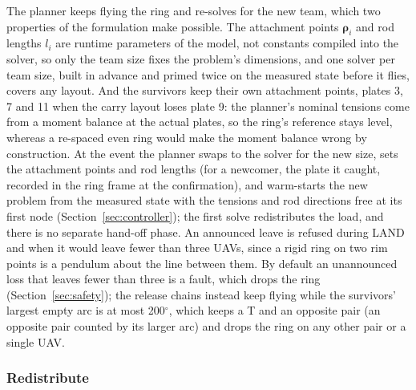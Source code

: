 The planner keeps flying the ring and re-solves for the new team, which two properties of the formulation make
possible. The attachment points $\boldsymbol{\rho}_i$ and rod lengths $l_i$ are runtime parameters of the model, not
constants compiled into the solver, so only the team size fixes the problem's dimensions, and one solver per team
size, built in advance and primed twice on the measured state before it flies, covers any layout. And the
survivors keep their own attachment points, plates 3, 7 and 11 when the carry layout loses plate 9: the planner's
nominal tensions come from a moment balance at the actual plates, so the ring's reference stays level, whereas a
re-spaced even ring would make the moment balance wrong by construction. At the event the planner swaps to the
solver for the new size, sets the attachment points and rod lengths (for a newcomer, the plate it caught, recorded
in the ring frame at the confirmation), and warm-starts the new problem from the measured state with the tensions
and rod directions free at its first node (Section~\ref{sec:controller}); the first solve redistributes the load,
and there is no separate hand-off phase. An announced leave is refused during LAND and when it would leave fewer
than three UAVs, since a rigid ring on two rim points is a pendulum about the line between them. By default an
unannounced loss that leaves fewer than three is a fault, which drops the ring (Section~\ref{sec:safety}); the
release chains instead keep flying while the survivors' largest empty arc is at most 200$^\circ$, which keeps a T and
an opposite pair (an opposite pair counted by its larger arc) and drops the ring on any other pair or a single UAV.

\subsubsection{Redistribute}

